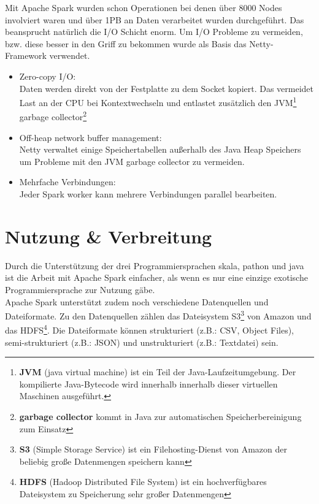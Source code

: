 Mit Apache Spark wurden schon Operationen bei denen über 8000 Nodes involviert waren und über 1PB an Daten verarbeitet wurden durchgeführt.
Das beansprucht natürlich die I/O Schicht enorm.
Um I/O Probleme zu vermeiden, bzw. diese besser in den Griff zu bekommen wurde als Basis das Netty-Framework verwendet.
\begin{itemize}
	\item Zero-copy I/O:\\
	Daten werden direkt von der Festplatte zu dem Socket kopiert. Das vermeidet Last an der CPU bei Kontextwechseln und entlastet zusätzlich den JVM\footnote{\textbf{JVM} (java virtual machine) ist ein Teil der Java-Laufzeitumgebung. Der kompilierte Java-Bytecode wird innerhalb innerhalb dieser virtuellen Maschinen ausgeführt.} garbage collector\footnote{\textbf{garbage collector} kommt in Java zur automatischen Speicherbereinigung zum Einsatz}
	\item Off-heap network buffer management:\\
	Netty verwaltet einige Speichertabellen außerhalb des Java Heap Speichers um Probleme mit den JVM garbage collector zu vermeiden.
	\item Mehrfache Verbindungen:\\
	Jeder Spark worker kann mehrere Verbindungen parallel bearbeiten.
\end{itemize}


\section{Nutzung \& Verbreitung}

Durch die Unterstützung der drei Programmiersprachen skala, pathon und java ist die Arbeit mit Apache Spark einfacher, als wenn es nur eine einzige exotische Programmiersprache zur Nutzung gäbe. \\

\noindent
Apache Spark unterstützt zudem noch verschiedene Datenquellen und Dateiformate.  Zu den Datenquellen zählen das Dateisystem S3\footnote{\textbf{S3} (Simple Storage Service) ist ein Filehosting-Dienst von Amazon der beliebig große Datenmengen speichern kann} von Amazon und das HDFS\footnote{\textbf{HDFS} (Hadoop Distributed File System) ist ein hochverfügbares Dateisystem zu Speicherung sehr großer Datenmengen}.
Die Dateiformate können strukturiert (z.B.: CSV, Object Files), semi-strukturiert (z.B.: JSON) und unstrukturiert (z.B.: Textdatei) sein.\\


